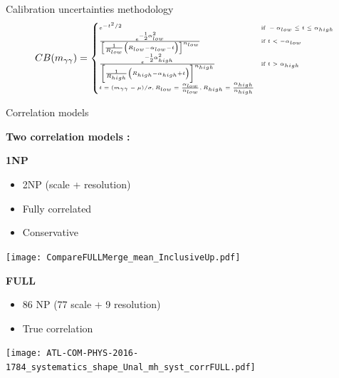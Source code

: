 \begin{frame}{Calibration uncertainties methodology}
    \begin{equation}
      \tiny
      CB(m_{\gamma \gamma}) = 
      \begin{cases}
        e^{-t^{2}/2} & \text{if } -\alpha_{low} \leq t \leq \alpha_{high} \\
        \frac{ e^{-{}^{1}_{2} \alpha_{low}^{2}} } { \left[ \frac{1}{R_{low}} \left(R_{low} - \alpha_{low} - t \right) \right]^{n_{low}} } & \text{if } t < -\alpha_{low} \\
        \frac{ e^{-{}^{1}_{2} \alpha_{high}^{2}} } { \left[ \frac{1}{R_{high}} \left(R_{high} - \alpha_{high} + t \right) \right]^{n_{high}} } & \text{if } t > \alpha_{high} \\
        t=(m_{\gamma\gamma}-\mu)/\sigma, R_{low}=\frac{\alpha_{low}}{n_{low}},  R_{high}=\frac{\alpha_{high}}{n_{high}} \\
      \end{cases}
    \end{equation}

\end{frame}

\begin{frame}{Correlation models }
  \begin{center}{\bf Two correlation models : } \end{center}
  \begin{minipage}[t]{0.49\linewidth}
    {\bf 1NP }
    \begin{itemize}
    \item 2NP (scale + resolution)
    \item Fully correlated
    \item Conservative
    \end{itemize}
    \texttt{[image: CompareFULLMerge\_mean\_InclusiveUp.pdf]}
  \end{minipage}
  \hfill
  \begin{minipage}[t]{0.49\linewidth}
    {\bf FULL}

\begin{itemize}
  \item 86 NP (77 scale + 9 resolution)
  \item True correlation
\end{itemize}
\texttt{[image: ATL-COM-PHYS-2016-1784\_systematics\_shape\_Unal\_mh\_syst\_corrFULL.pdf]}\\
\centering

\end{minipage}
  
\end{frame}


